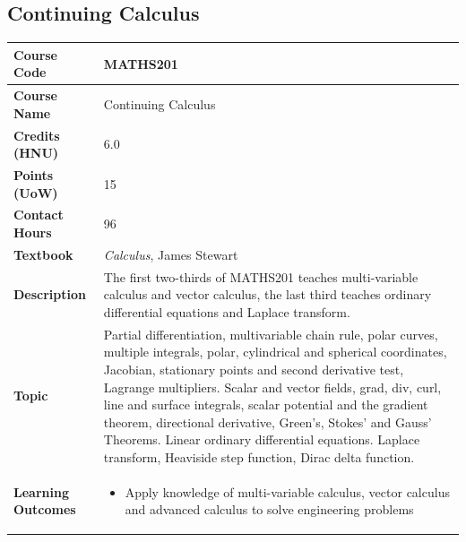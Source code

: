 \documentclass{article}
\begin{document}
\subsection[MATHS201 Continuing Calculus]{Continuing Calculus}
\renewcommand{\arraystretch}{1.5} %
\begin{longtable}{|p{3cm}|p{10cm}|}
\hline
\textbf{Course Code} & MATHS201 \\
\hline
\textbf{Course Name} & Continuing Calculus\\
\hline
\textbf{Credits (HNU)} & 6.0 \\
\hline
\textbf{Points (UoW)} & 15 \\
\hline
\textbf{Contact Hours} & 96 \\
\hline
\textbf{Textbook} & \emph{Calculus}, James Stewart \\
\hline
\textbf{Description} & The first two-thirds of MATHS201 teaches multi-variable calculus and vector calculus, the last third teaches ordinary differential equations and Laplace transform. \\
\hline
\textbf{Topic} & Partial differentiation, multivariable chain rule, polar curves, multiple integrals, polar, cylindrical and spherical coordinates, Jacobian, stationary points and second derivative test, Lagrange multipliers. Scalar and vector fields, grad, div, curl, line and surface integrals, scalar potential and the gradient theorem, directional derivative, Green's, Stokes' and Gauss' Theorems. Linear ordinary differential equations. Laplace transform, Heaviside step function, Dirac delta function. \\
\hline
\textbf{Learning Outcomes} & 
    \begin{itemize}
        \item Apply knowledge of multi-variable calculus, vector calculus and advanced calculus to solve engineering problems
    \end{itemize} \\
\hline
\end{longtable}
\end{document}
